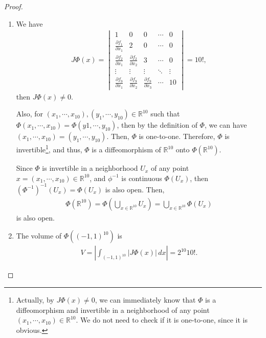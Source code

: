 \documentclass[11pt]{article}
\theoremstyle{definition}
\numberwithin{equation}{subsection}
\begin{document}
\begin{proof}
~\begin{enumerate}[label=(\alph*)]
    \item We have
    \begin{align*}
        J\Phi(x) = \begin{vmatrix}
            1 & 0 & 0 & \cdots & 0 \\
            \frac{\partial f_1}{\partial x_1} & 2 & 0 & \cdots & 0 \\
            \frac{\partial f_2}{\partial x_1} & \frac{\partial f_2}{\partial x_2} & 3 & \cdots & 0 \\
            \vdots & \vdots & \vdots & \ddots & \vdots \\
            \frac{\partial f_9}{\partial x_1} & \frac{\partial f_9}{\partial x_2} & \frac{\partial f_9}{\partial x_3} & \cdots & 10
        \end{vmatrix} = 10!,
    \end{align*}
    then $J\Phi(x) \neq 0$.
    
    Also, for $(x_1, \cdots, x_{10}), (y_1, \cdots, y_{10}) \in \mathbb{R}^{10}$ such that $\Phi(x_1, \cdots, x_{10}) = \Phi(y1, \cdots, y_{10})$, then by the definition of $\Phi$, we can have $(x_1, \cdots, x_{10}) = (y_1, \cdots, y_{10})$. Then, $\Phi$ is one-to-one. Therefore, $\Phi$ is invertible\footnote{Actually, by $J\Phi(x) \neq 0$, we can immediately know that $\Phi$ is a diffeomorphism and invertible in a neighborhood of any point $(x_1,\cdots, x_{10}) \in \mathbb{R}^{10}$. We do not need to check if it is one-to-one, since it is obvious.}, and thus, $\Phi$ is a diffeomorphism of $\mathbb{R}^{10}$ onto $\Phi(\mathbb{R}^{10})$.
    
    Since $\Phi$ is invertible in a neighborhood $U_x$ of any point $x = (x_1,\cdots, x_{10}) \in \mathbb{R}^{10}$, and $\phi^{-1}$ is continuous $\Phi(U_x)$, then $(\Phi^{-1})^{-1}(U_x) = \Phi(U_x)$ is also open. Then,
    \begin{align*}
        \Phi(\mathbb{R}^{10}) = \Phi \left( \bigcup_{x \in \mathbb{R}^{10}} U_x \right) = \bigcup_{x \in \mathbb{R}^{10}} \Phi \left(U_x \right)
    \end{align*}
    is also open.
    
    \item The volume of $\Phi((-1,1)^{10})$ is
    \begin{align*}
        V = \left| \int_{(-1,1)^{10}} |J\Phi(x)|\, dx \right| = 2^{10}10!.
    \end{align*}
\end{enumerate}
\end{proof}
\end{document}
